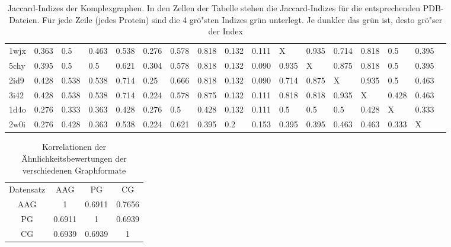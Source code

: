 \documentclass{report}
\begin{document}
\begin{table}
{\begin{tabular}{l l l l l l l l l l l l l l l l l}
1wjx & 0.363 & 0.5 & 0.463 & 0.538 & 0.276 & 0.578 & \cellcolor{fGreen!50}0.818 & 0.132 & 0.111 &   X   & \cellcolor{fGreen!100}0.935 & \cellcolor{fGreen!25}0.714 & \cellcolor{fGreen!75}0.818 & 0.5 & 0.395 &  \\
5chy & 0.395 & 0.5 & 0.5 & 0.621 & 0.304 & 0.578 & \cellcolor{fGreen!25}0.818 & 0.132 & 0.090 & \cellcolor{fGreen!100}0.935 &   X   & \cellcolor{fGreen!75}0.875 & \cellcolor{fGreen!50}0.818 & 0.5 & 0.395 &  \\
2id9 & 0.428 & 0.538 & 0.538 & 0.714 & 0.25 & 0.666 & \cellcolor{fGreen!50}0.818 & 0.132 & 0.090 & \cellcolor{fGreen!25}0.714 & \cellcolor{fGreen!75}0.875 &   X   & \cellcolor{fGreen!100}0.935 & 0.5 & 0.463 &  \\
3i42 & 0.428 & 0.538 & 0.538 & 0.714 & 0.224 & 0.578 & \cellcolor{fGreen!75}0.875 & 0.132 & 0.111 & \cellcolor{fGreen!25}0.818 & \cellcolor{fGreen!50}0.818 & \cellcolor{fGreen!100}0.935 &   X   & 0.428 & 0.463 &  \\
1d4o & 0.276 & 0.333 & 0.363 & 0.428 & 0.276 & \cellcolor{fGreen!100}0.5 & 0.428 & 0.132 & 0.111 & \cellcolor{fGreen!50}0.5 & \cellcolor{fGreen!25}0.5 & \cellcolor{fGreen!75}0.5 & 0.428 &   X   & 0.333 &  \\
2w0i & 0.276 & 0.428 & 0.363 & \cellcolor{fGreen!75}0.538 & 0.224 & \cellcolor{fGreen!100}0.621 & 0.395 & 0.2 & 0.153 & 0.395 & 0.395 & \cellcolor{fGreen!25}0.463 & \cellcolor{fGreen!50}0.463 & 0.333 &   X   &  \\

\end{tabular}}
\caption{Jaccard-Indizes der Komplexgraphen. In den Zellen der Tabelle stehen die Jaccard-Indizes f\"ur die entsprechenden PDB-Dateien. F\"ur jede Zeile (jedes Protein) sind die 4 gr\"o"sten Indizes gr\"un unterlegt. Je dunkler das gr\"un ist, desto gr\"o"ser der Index}
\end{table}


\begin{table}
\label{tab:correlations}
\begin{tabular}{c c c c}
Datensatz & AAG     &     PG &     CG \\
AAG       &  1      & 0.6911 & 0.7656 \\
PG        &  0.6911 &      1 & 0.6939 \\
CG        &  0.6939 & 0.6939 & 1      \\

\end{tabular}
\caption{Korrelationen der \"Ahnlichkeitsbewertungen der verschiedenen Graphformate}
\end{table}
\end{document}
